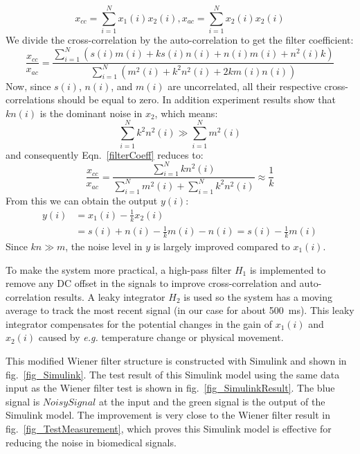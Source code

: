 $$x_{cc}=\displaystyle\sum_{i=1}^{N} x_1(i)x_2(i), x_{ac}=\displaystyle\sum_{i=1}^{N} x_2(i)x_2(i)$$
We divide the cross-correlation by the auto-correlation to get the filter coefficient:
\begin{equation}
\label{filterCoeff}
    \frac{x_{cc}}{x_{ac}} =\frac{\displaystyle\sum_{i=1}^{N} \left(s(i)m(i)+ks(i)n(i)+n(i)m(i)+n^2(i)k\right)}{\displaystyle\sum_{i=1}^{N} \left(m^2(i)+k^2n^2(i)+2km(i)n(i)\right)}
\end{equation}
Now, since $s(i)$, $n(i)$, and $m(i)$ are uncorrelated, all their respective cross-correlations should be equal to zero. In addition experiment results show that $kn(i)$ is the dominant noise in $x_2$, which means: 
$$
\sum_{i=1}^{N} k^2n^2(i) \gg \sum_{i=1}^{N} m^2(i)
$$
and consequently Eqn.~\ref{filterCoeff} reduces to:
$$
\frac{x_{cc}}{x_{ac}}=\frac{\displaystyle\sum_{i=1}^{N} kn^2(i)}{\displaystyle\sum_{i=1}^{N} m^2(i) + \displaystyle\sum_{i=1}^{N} k^2n^2(i)} \approx \frac{1}{k} 
$$
From this we can obtain the output $y(i)$:
\begin{align*}
    y(i)&=x_1(i)-\frac{1}{k}x_2(i) \\
    &=s(i)+n(i)-\frac{1}{k}m(i)-n(i)=s(i)-\frac{1}{k}m(i)
\end{align*}
Since $kn \gg m$, the noise level in $y$ is largely improved compared to $x_1(i)$.

To make the system more practical, a high-pass filter $H_1$ is implemented to remove any DC offset in the signals to improve cross-correlation and auto-correlation results.  A leaky integrator $H_2$ is used so the system has a moving average to track the most recent signal (in our case for about \qty{500}{ms}).  This leaky integrator compensates for the potential changes in the gain of $x_1(i)$ and $x_2(i)$ caused by {\em e.g.} temperature change or physical movement.

This modified Wiener filter structure is constructed with Simulink and shown in fig.~\ref{fig_Simulink}.  The test result of this Simulink model using the same data input as the Wiener filter test is shown in fig.~\ref{fig_SimulinkResult}.  The blue signal is $NoisySignal$ at the input and the green signal is the output of the Simulink model.  The improvement is very close to the Wiener filter result in fig.~\ref{fig_TestMeasurement}, which proves this Simulink model is effective for reducing the noise in biomedical signals.


